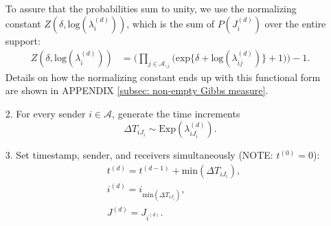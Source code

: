 \documentclass[a4paper]{article}
\begin{document}
\begin{itemize}
	To assure that the probabilities sum to unity, we use the normalizing constant $Z(\delta,\mbox{log}(\lambda_i^{(d)}))$, which is the sum of $P(J_i^{(d)})$ over the entire support: 
	\begin{equation}
	\begin{aligned}
	Z(\delta,\mbox{log}(\lambda_i^{(d)})) &=\Big(\prod_{j \in \mathcal{A}_{\backslash i}} \Big(\mbox{exp}\{\delta+\mbox{log}(\lambda_{ij}^{(d)})\} + 1\Big)\Big)-1.
		\end{aligned}
	\end{equation}
	Details on how the normalizing constant ends up with this functional form are shown in APPENDIX \ref{subsec: non-empty Gibbs measure}.
	\item[2.] For every sender $i \in \mathcal{A}$, generate the time increments \begin{equation}
\Delta T_{i{J_i}} \sim \mbox{Exp}(\lambda_{i{J_i}}^{(d)}).
	\end{equation}
	 	 \item[3.] Set timestamp, sender, and receivers simultaneously (NOTE: $t^{(0)}=0$):
	 	 \begin{equation}
	 	 \begin{aligned}
	 	 &t^{(d)} = t^{(d-1)}+\mbox{min}(\Delta T_{i{J_i}}),\\
	 	  &i^{(d)} = i_{\mbox{min}(\Delta T_{i{J_i}})}, \\
	 	  &J^{(d)} = J_{i^{(d)}}.
	 	  \end{aligned}
	 	 \end{equation}
\end{itemize}
\end{document}
